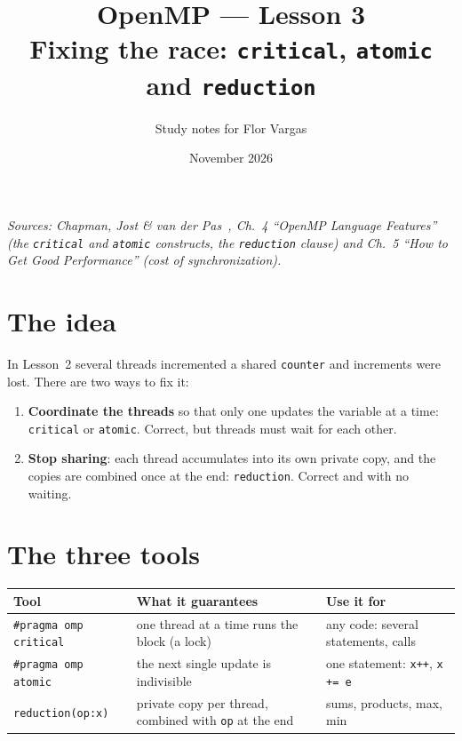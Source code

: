 \documentclass[11pt,a4paper]{article}
\title{\textbf{OpenMP --- Lesson 3}\\[4pt]\large Fixing the race: \texttt{critical}, \texttt{atomic} and \texttt{reduction}}
\author{Study notes for Flor Vargas}
\date{November 2026}
\begin{document}
\maketitle

\noindent\textit{\small Sources: Chapman, Jost \& van der Pas~\cite{chapman}, Ch.~4
``OpenMP Language Features'' (the \texttt{critical} and \texttt{atomic} constructs, the
\texttt{reduction} clause) and Ch.~5 ``How to Get Good Performance'' (cost of
synchronization).}

\section{The idea}
In Lesson~2 several threads incremented a shared \texttt{counter} and increments were
lost. There are two ways to fix it:
\begin{enumerate}
  \item \textbf{Coordinate the threads} so that only one updates the variable at a time:
        \texttt{critical} or \texttt{atomic}. Correct, but threads must wait for each other.
  \item \textbf{Stop sharing}: each thread accumulates into its own private copy, and the
        copies are combined once at the end: \texttt{reduction}. Correct and with no waiting.
\end{enumerate}

\section{The three tools}
\begin{center}
\small
\begin{tabular}{@{}p{4.1cm}p{6.2cm}p{4.9cm}@{}}
\toprule
Tool & What it guarantees & Use it for \\ \midrule
\texttt{\#pragma omp critical} & one thread at a time runs the block (a lock)
  & any code: several statements, calls \\
\texttt{\#pragma omp atomic} & the next single update is indivisible
  & one statement: \texttt{x++}, \texttt{x += e} \\
\texttt{reduction(op:x)} & private copy per thread, combined with \texttt{op} at the end
  & sums, products, max, min \\
\bottomrule
\end{tabular}
\end{center}
\end{document}
